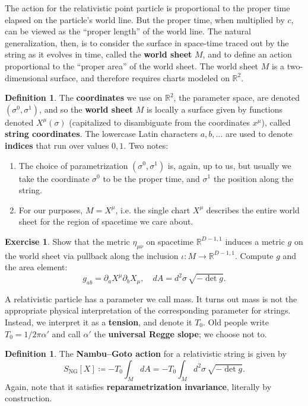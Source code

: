 \documentclass{report}
\theoremstyle{plain}
\theoremstyle{definition}
\newtheorem{definition}[theorem]{Definition}
\newtheorem{exercise}{Exercise}[section]
\theoremstyle{remark}
\newcommand{\di}{\partial}
\newcommand{\bR}{\mathbb{R}}
\begin{document}
The action for the relativistic point particle is proportional to the
proper time elapsed on the particle's world line. But the proper time,
when multiplied by $c$, can be viewed as the ``proper length'' of the
world line. The natural generalization, then, is to consider the
surface in space-time traced out by the string as it evolves in time,
called the {\bf world sheet} $M$, and to define an action proportional
to the ``proper area'' of the world sheet. The world sheet $M$ is a
two-dimensional surface, and therefore requires charts modeled on
$\bR^2$.

\begin{definition}
  The {\bf coordinates} we use on $\bR^2$, the parameter space, are
  denoted $(\sigma^0, \sigma^1)$, and so the {\bf world sheet} $M$ is
  locally a surface given by functions denoted $X^\mu(\sigma)$
  (capitalized to disambiguate from the coordinates $x^\mu$), called
  {\bf string coordinates}. The lowercase Latin characters $a, b,
  \ldots$ are used to denote {\bf indices} that run over values $0,1$.
  Two notes:
  \begin{enumerate}
  \item The choice of parametrization $(\sigma^0, \sigma^1)$ is,
    again, up to us, but usually we take the coordinate $\sigma^0$ to
    be the proper time, and $\sigma^1$ the position along the string.
  \item For our purposes, $M = X^\mu$, i.e. the single chart $X^\mu$
    describes the entire world sheet for the region of spacetime we
    care about.
  \end{enumerate}
\end{definition}

\begin{exercise}
  Show that the metric $\eta_{\mu\nu}$ on spacetime $\bR^{D-1,1}$
  induces a metric $g$ on the world sheet via pullback along the
  inclusion $\iota\colon M \to \bR^{D-1,1}$. Compute $g$ and the area
  element:
  \[ g_{ab} = \di_a X^\mu \di_b X_\mu, \quad dA =  d^2\sigma \, \sqrt{-\det g}. \]
\end{exercise}

A relativistic particle has a parameter we call mass. It turns out
mass is not the appropriate physical interpretation of the
corresponding parameter for strings. Instead, we interpret it as a
{\bf tension}, and denote it $T_0$. Old people write $T_0 = 1/2\pi
\alpha'$ and call $\alpha'$ the {\bf universal Regge slope}; we choose
not to.

\begin{definition}
  The {\bf Nambu--Goto action} for a relativistic string is given by
  \[ S_{\text{NG}}[X] \coloneqq -T_0 \int_M dA = -T_0 \int_M d^2\sigma \, \sqrt{-\det g}. \]
  Again, note that it satisfies {\bf reparametrization invariance},
  literally by construction.
\end{definition}
\end{document}
